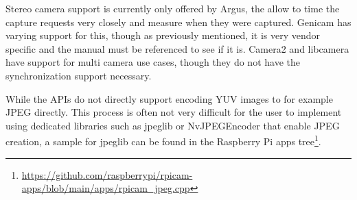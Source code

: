 Stereo camera support is currently only offered by Argus, the allow
to time the capture requests very closely and measure when they were captured.
Genicam has varying support for this, though as previously mentioned, it is very
vendor specific and the manual must be referenced to see if it is. Camera2 and
libcamera have support for multi camera use cases, though they do not have the
synchronization support necessary.

While the APIs do not directly support encoding YUV images to for example JPEG
directly. This process is often not very difficult for the user to implement
using dedicated libraries such as jpeglib or NvJPEGEncoder that enable JPEG
creation, a sample for jpeglib can be found in the Raspberry Pi apps
tree\footnote{\url{https://github.com/raspberrypi/rpicam-apps/blob/main/apps/rpicam\_jpeg.cpp}}.

